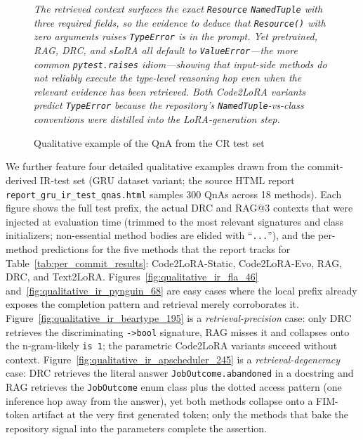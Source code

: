 \documentclass{llmxive}
\providecommand{\codelora}{Code2LoRA\xspace}
\providecommand{\codelorastatic}{\codelora-Static\xspace}
\providecommand{\codeloraevo}{\codelora-Evo\xspace}
\providecommand{\textlora}{Text2LoRA\xspace}
\begin{document}
\begin{figure}[!htbp]
\begin{center}
\begin{tcolorbox}
\vspace{1pt}
{\footnotesize\itshape
The retrieved context surfaces the exact \texttt{Resource} \texttt{NamedTuple} with three required fields, so the evidence to deduce that \texttt{Resource()} with zero arguments raises \texttt{TypeError} is in the prompt. Yet pretrained, RAG, DRC, and sLoRA all default to \texttt{ValueError}---the more common \texttt{pytest.raises} idiom---showing that input-side methods do not reliably execute the type-level reasoning hop even when the relevant evidence has been retrieved. Both \codelora{} variants predict \texttt{TypeError} because the repository's \texttt{NamedTuple}-vs-class conventions were distilled into the LoRA-generation step.
}

\end{tcolorbox}
\caption{Qualitative example of the QnA from the CR test set}
\label{fig:qualitative_kopf_detailed}
\end{center}
\end{figure}


We further feature four detailed qualitative examples drawn from the commit-derived IR-test set (GRU dataset variant; the source HTML report \texttt{report\_gru\_ir\_test\_qnas.html} samples 300 QnAs across 18 methods).
Each figure shows the full test prefix, the actual DRC and RAG@3 contexts that were injected at evaluation time (trimmed to the most relevant signatures and class initializers; non-essential method bodies are elided with ``\texttt{...}''), and the per-method predictions for the five methods that the report tracks for Table~\ref{tab:per_commit_results}: \codelorastatic{}, \codeloraevo{}, RAG, DRC, and \textlora{}.
Figures~\ref{fig:qualitative_ir_fla_46} and~\ref{fig:qualitative_ir_pynguin_68} are easy cases where the local prefix already exposes the completion pattern and retrieval merely corroborates it.
Figure~\ref{fig:qualitative_ir_beartype_195} is a \emph{retrieval-precision} case: only DRC retrieves the discriminating \texttt{->\;bool} signature, RAG misses it and collapses onto the n-gram-likely \texttt{is 1}; the parametric \codelora{} variants succeed without context.
Figure~\ref{fig:qualitative_ir_apscheduler_245} is a \emph{retrieval-degeneracy} case: DRC retrieves the literal answer \texttt{JobOutcome.abandoned} in a docstring and RAG retrieves the \texttt{JobOutcome} enum class plus the dotted access pattern (one inference hop away from the answer), yet both methods collapse onto a FIM-token artifact at the very first generated token; only the methods that bake the repository signal into the parameters complete the assertion.
\end{document}
